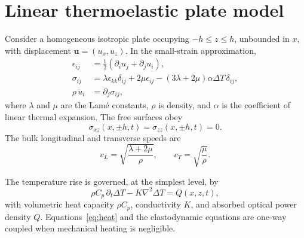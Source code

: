\section{Linear thermoelastic plate model}

Consider a homogeneous isotropic plate occupying $-h\le z\le h$, unbounded in
$x$, with displacement $\bm u=(u_x,u_z)$. In the small-strain approximation,
\begin{align}
  \epsilon_{ij} &= \frac{1}{2}(\partial_i u_j+\partial_j u_i),\\
  \sigma_{ij} &= \lambda\epsilon_{kk}\delta_{ij}
  +2\mu\epsilon_{ij}-(3\lambda+2\mu)\alpha\Delta T\,\delta_{ij},\\
  \rho\,\ddot u_i &= \partial_j\sigma_{ij},
\end{align}
where $\lambda$ and $\mu$ are the Lam\'e constants, $\rho$ is density, and
$\alpha$ is the coefficient of linear thermal expansion. The free surfaces obey
\begin{equation}
  \sigma_{xz}(x,\pm h,t)=\sigma_{zz}(x,\pm h,t)=0.
\end{equation}
The bulk longitudinal and transverse speeds are
\begin{equation}
  c_L=\sqrt{\frac{\lambda+2\mu}{\rho}},\qquad
  c_T=\sqrt{\frac{\mu}{\rho}}.
\end{equation}

The temperature rise is governed, at the simplest level, by
\begin{equation}
  \rho C_p\,\partial_t\Delta T-K\nabla^2\Delta T=Q(x,z,t),
  \label{eq:heat}
\end{equation}
with volumetric heat capacity $\rho C_p$, conductivity $K$, and absorbed optical
power density $Q$. Equations~\eqref{eq:heat} and the elastodynamic equations are
one-way coupled when mechanical heating is negligible.
